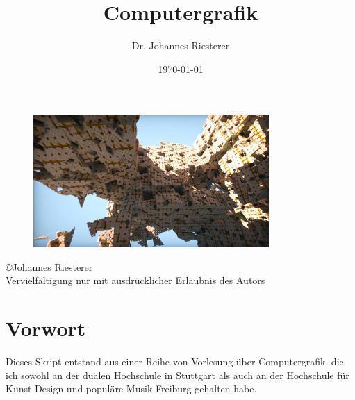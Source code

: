 \title{ Computergrafik}
\author{Dr. Johannes Riesterer}
\date{\today}
\maketitle\thispagestyle{empty}
 \begin{figure}[H]
    \centering
    \includegraphics[width=0.8\textwidth]{images/cover.jpg}
    \label{fig:diffus}
\end{figure}
\newpage 
\begin{center}
\large
 \copyright Johannes Riesterer \\
Vervielfältigung nur mit ausdrücklicher Erlaubnis des Autors
\end{center}
\thispagestyle{empty}
\newpage

\section*{Vorwort}
\mbox{}\thispagestyle{empty}

Dieses Skript entstand aus einer Reihe von Vorlesung über Computergrafik, die ich sowohl an der dualen Hochschule in Stuttgart als auch an der Hochschule für 
Kunst Design und populäre Musik Freiburg gehalten habe.

\newpage
